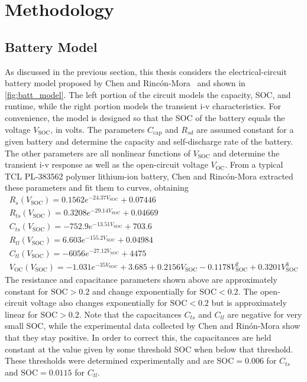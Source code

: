 \documentclass[../zhang_thesis.tex]{subfiles}
\begin{document}
\chapter{Methodology}


\section{Battery Model}

As discussed in the previous section, this thesis considers the electrical-circuit battery model proposed by Chen and Rinc\'on-Mora~\cite{chen06} and shown in \autoref{fig:batt_model}. The left portion of the circuit models the capacity, SOC, and runtime, while the right portion models the transient i-v characteristics.  For convenience, the model is designed so that the SOC of the battery equals the voltage $V_\text{SOC}$, in volts. The parameters $C_\text{cap}$ and $R_{sd}$ are assumed constant
for a given battery and determine the capacity and self-discharge rate of the battery. The other parameters are all nonlinear functions of $V_\text{SOC}$ and determine the transient i-v response as well as the open-circuit voltage $V_\text{OC}$. From a typical TCL PL-383562 polymer lithium-ion battery, Chen and Rinc\'on-Mora extracted these parameters and fit them to curves, obtaining
\begin{gather}
	R_s(V_\text{SOC}) = 0.1562 e^{-24.37 V_\text{SOC}} + 0.07446 \\
	R_{ts}(V_\text{SOC}) = 0.3208 e^{-29.14 V_\text{SOC}} + 0.04669 \\
	C_{ts}(V_\text{SOC}) = -752.9 e^{-13.51 V_\text{SOC}} + 703.6 \\
	R_{tl}(V_\text{SOC}) = 6.603 e^{-155.2 V_\text{SOC}} + 0.04984 \\
	C_{tl}(V_\text{SOC}) = -6056 e^{-27.12 V_\text{SOC}} + 4475 \\
	V_\text{OC}(V_\text{SOC}) = -1.031 e^{-35 V_\text{SOC}} + 3.685 + 0.2156 V_\text{SOC} - 0.1178 V_\text{SOC}^2 + 0.3201 V_\text{SOC}^3
\end{gather}
The resistance and capacitance parameters shown above are approximately constant for $\text{SOC}>0.2$ and change exponentially for $\text{SOC}<0.2$. The open-circuit voltage also changes exponentially for $\text{SOC}<0.2$ but is approximately linear for $\text{SOC}>0.2$. Note that the capacitances $C_{ts}$ and $C_{tl}$ are negative for very small SOC, while the experimental data collected by Chen and Rin\'on-Mora show that they stay positive. In order to correct this, the capacitances
are held constant at the value given by some threshold SOC when below that threshold. These thresholds were determined experimentally and are $\text{SOC}=0.006$ for $C_{ts}$ and $\text{SOC}=0.0115$ for $C_{tl}$.
\end{document}
